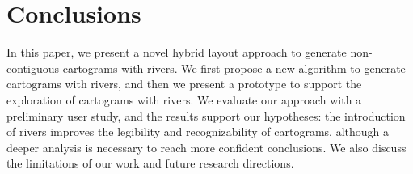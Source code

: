 \section{Conclusions}\label{sec:{Conclusions}}

In this paper, we present a novel hybrid layout approach to generate non-contiguous cartograms with rivers. We first propose a new algorithm to generate cartograms with rivers, and then we present a prototype to support the exploration of cartograms with rivers. We evaluate our approach with a preliminary user study, and the results support our hypotheses: the introduction of rivers improves the legibility and recognizability of cartograms, although a deeper analysis is necessary to reach more confident conclusions. We also discuss the limitations of our work and future research directions.